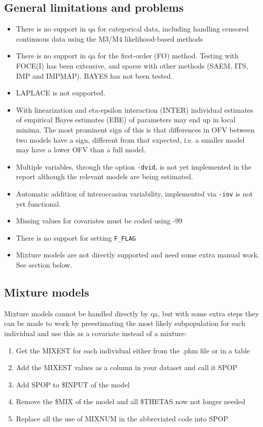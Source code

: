 \subsection{General limitations and problems}
\begin{itemize}
	\item There is no support in qa for categorical data, including handling censored continuous data using the M3/M4 likelihood-based methods
	\item There is no support in qa for the first-order (FO) method. Testing with FOCE(I) has been extensive, and sparse with other methods (SAEM, ITS, IMP and IMPMAP). BAYES has not been tested. 
    \item LAPLACE is not supported.
	\item With linearization and eta-epsilon interaction (INTER) individual estimates of empirical Bayes estimates (EBE) of parameters may end up in local minima. The most prominent sign of this is that differences in OFV between two models have a sign, different from that expected, i.e. a smaller model may have a lower OFV than a full model.
	\item Multiple variables, through the option \verb|-dvid|, is not yet implemented in the report although the relevant models are being estimated.
	\item Automatic addition of interoccasion variability, implemented via \verb|-iov| is not yet functional.
    \item Missing values for covariates must be coded using -99
    \item There is no support for setting \verb|F_FLAG|
    \item Mixture models are not directly supported and need some extra manual work. See section below.
\end{itemize}

\subsection{Mixture models}
Mixture models cannot be handled directly by qa, but with some extra steps they can be made to work by preestimating the most likely subpopulation for each individual and use this as a covariate instead of a mixture:
\begin{enumerate}
    \item Get the MIXEST for each individual either from the .phm file or in a table
    \item Add the MIXEST values as a column in your dataset and call it SPOP
    \item Add SPOP to \$INPUT of the model
    \item Remove the \$MIX of the model and all \$THETAS now not longer needed
    \item Replace all the use of MIXNUM in the abbreviated code into SPOP
\end{enumerate}


